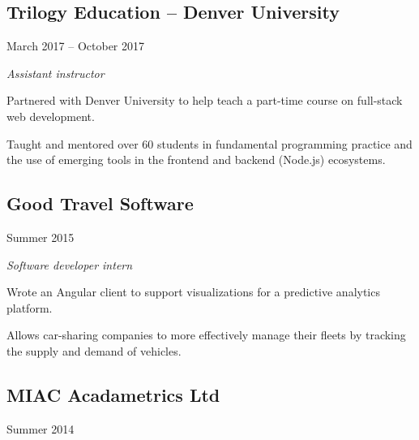 \noindent\begin{minipage}[t]{0.55\textwidth}
\subsection*{Trilogy Education -- Denver University}
\end{minipage}
\noindent\begin{minipage}[t]{0.45\textwidth}
  \flushright
  March 2017 -- October 2017
\end{minipage}

\emph{Assistant instructor}

\begin{itemize}
  {\small
  \item Partnered with Denver University to help teach a part-time course on
    full-stack web development.
  \item Taught and mentored over 60 students in fundamental programming practice
    and the use of emerging tools in the frontend and backend (Node.js)
    ecosystems.
  }
\end{itemize}

\noindent\begin{minipage}[t]{0.5\textwidth}
  \subsection*{Good Travel Software}
\end{minipage}
\noindent\begin{minipage}[t]{0.5\textwidth}
  \flushright
  Summer 2015
\end{minipage}

\emph{Software developer intern}

\begin{itemize}
  {\small
  \item Wrote an Angular client to support visualizations for a predictive
    analytics platform.
  \item Allows car-sharing companies to more effectively manage their fleets by
    tracking the supply and demand of vehicles.
  }
\end{itemize}

\noindent\begin{minipage}[t]{0.5\textwidth}
  \subsection*{MIAC Acadametrics Ltd}
\end{minipage}
\noindent\begin{minipage}[t]{0.5\textwidth}
  \flushright
  Summer 2014
\end{minipage}

